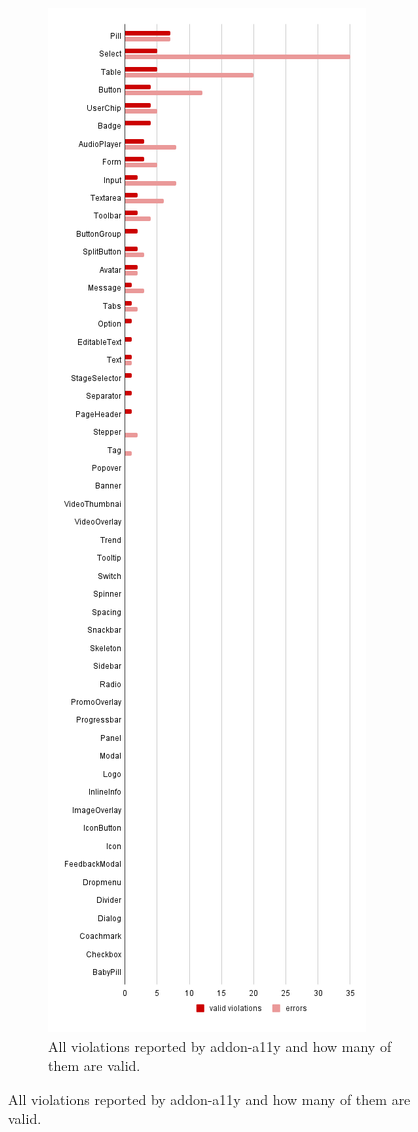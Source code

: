 \documentclass{master_thesis}
\begin{document}
\begin{figure}[h]
	\begin{subfigure}{0.45\textwidth}
	\includegraphics[height=0.9\textheight]{img/audit-failed.png}
	\caption{All violations reported by addon-a11y and how many of them are valid.}

\end{subfigure}
\end{figure}
\end{document}
